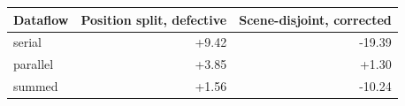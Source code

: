 \begin{tabular}{lrr}
\hline
Dataflow & Position split, defective & Scene-disjoint, corrected \\
\hline
serial & +9.42 & -19.39 \\
parallel & +3.85 & +1.30 \\
summed & +1.56 & -10.24 \\
\hline
\end{tabular}
